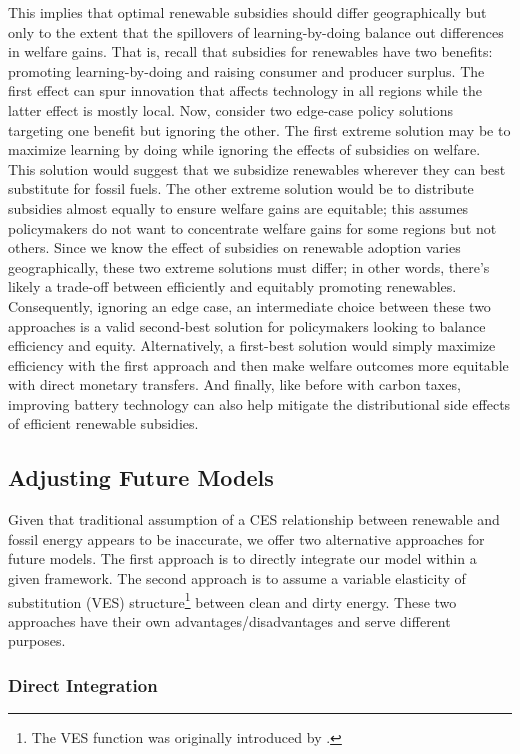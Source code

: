 \documentclass[11pt,a4paper]{extarticle}
\begin{document}
This implies that optimal renewable subsidies should differ geographically but only to the extent that the spillovers of learning-by-doing balance out differences in welfare gains. That is, recall that subsidies for renewables have two benefits: promoting learning-by-doing and raising consumer and producer surplus. The first effect  can spur innovation that affects technology in all regions while the latter effect is mostly local. Now, consider two edge-case policy solutions targeting one benefit but ignoring the other. The first extreme solution may be to maximize learning by doing while ignoring the effects of subsidies on welfare. This solution would suggest that we subsidize renewables wherever they can best substitute for fossil fuels. The other extreme solution would be to distribute subsidies almost equally to ensure welfare gains are equitable; this assumes policymakers do not want to concentrate welfare gains for some regions but not others. Since we know the effect of subsidies on renewable adoption varies geographically, these two extreme solutions must differ; in other words, there's likely a trade-off between efficiently and equitably promoting renewables. Consequently, ignoring an edge case, an intermediate choice between these two approaches is a valid second-best solution for policymakers looking to balance efficiency and equity. Alternatively, a first-best solution would simply maximize efficiency with the first approach and then make welfare outcomes more equitable with direct monetary transfers. And finally, like before with carbon taxes, improving battery technology can also help mitigate the distributional side effects of efficient renewable subsidies. 

\subsection{Adjusting Future Models}

Given that traditional assumption of a CES relationship between renewable and fossil energy appears to be inaccurate, we offer two alternative approaches for future models. The first approach is to directly integrate our model within a given framework. The second approach is to assume a variable elasticity of substitution (VES) structure\footnote{ The VES function was originally introduced by \citet{VES}.} between clean and dirty energy. These two approaches have their own advantages/disadvantages and serve different purposes. 

\subsubsection{Direct Integration}
\end{document}
